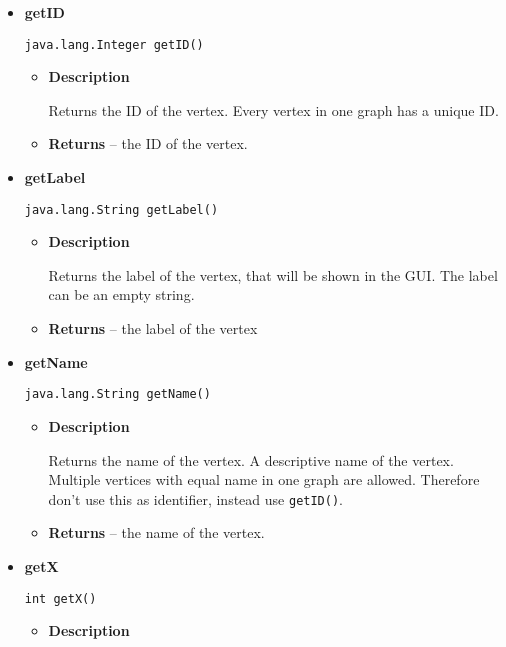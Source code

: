 {{{{{{{{{{{{\begin{itemize}
{\begin{itemize}
{Adds Values to FastGraphAccessor
}
\end{itemize}
}%
\item{ 
{\bf  getID}\\
\begin{lstlisting}[frame=none]
java.lang.Integer getID()\end{lstlisting} %
\begin{itemize}
\item{
{\bf  Description}

Returns the ID of the vertex. Every vertex in one graph has a unique ID.
}
\item{{\bf  Returns} -- 
the ID of the vertex. 
}%
\end{itemize}
}%
\item{ 
{\bf  getLabel}\\
\begin{lstlisting}[frame=none]
java.lang.String getLabel()\end{lstlisting} %
\begin{itemize}
\item{
{\bf  Description}

Returns the label of the vertex, that will be shown in the GUI. The label can be an empty string.
}
\item{{\bf  Returns} -- 
the label of the vertex 
}%
\end{itemize}
}%
\item{ 
{\bf  getName}\\
\begin{lstlisting}[frame=none]
java.lang.String getName()\end{lstlisting} %
\begin{itemize}
\item{
{\bf  Description}

Returns the name of the vertex. A descriptive name of the vertex. Multiple vertices with equal name in one graph are allowed. Therefore don't use this as identifier, instead use \texttt{\small getID()}.
}
\item{{\bf  Returns} -- 
the name of the vertex. 
}%
\end{itemize}
}%
\item{ 
{\bf  getX}\\
\begin{lstlisting}[frame=none]
int getX()\end{lstlisting} %
\begin{itemize}
\item{
{\bf  Description}

}
\end{itemize}}
\end{itemize}}}}}}}}}}}}}
